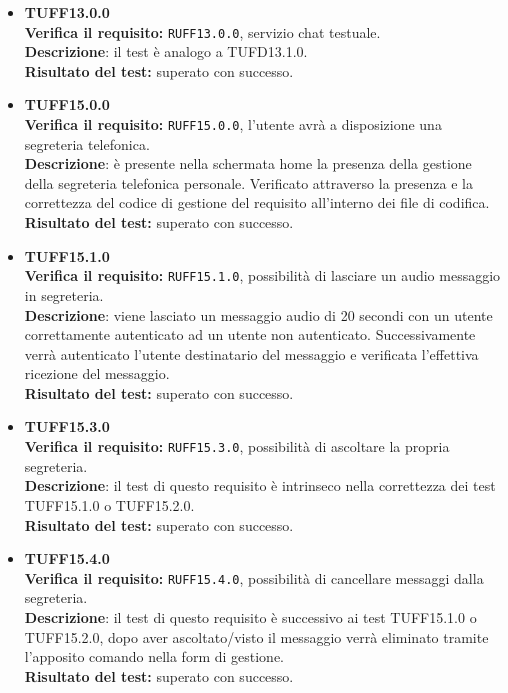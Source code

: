 \begin{itemize}
\item \textbf{TUFF13.0.0}\\
\textbf{Verifica il requisito:} \texttt{RUFF13.0.0}, servizio chat testuale.\\
\textbf{Descrizione}: il test è analogo a TUFD13.1.0.\\
\textbf{Risultato del test:} superato con successo.

\item \textbf{TUFF15.0.0}\\
\textbf{Verifica il requisito:} \texttt{RUFF15.0.0}, l'utente avrà a disposizione una segreteria telefonica.\\
\textbf{Descrizione}: è presente nella schermata home la presenza della gestione della segreteria telefonica personale. Verificato attraverso la presenza e la correttezza del codice di gestione del requisito all'interno dei file di codifica.\\
\textbf{Risultato del test:} superato con successo.

\item \textbf{TUFF15.1.0}\\
\textbf{Verifica il requisito:} \texttt{RUFF15.1.0}, possibilità di lasciare un audio messaggio in segreteria.\\
\textbf{Descrizione}: viene lasciato un messaggio audio di 20 secondi con un utente  correttamente autenticato ad un utente  non autenticato. Successivamente verrà autenticato l'utente  destinatario del messaggio e verificata l'effettiva ricezione del messaggio.\\
\textbf{Risultato del test:} superato con successo.

\item \textbf{TUFF15.3.0}\\
\textbf{Verifica il requisito:} \texttt{RUFF15.3.0}, possibilità di ascoltare la propria segreteria.\\
\textbf{Descrizione}: il test di questo requisito è intrinseco nella correttezza dei test TUFF15.1.0 o TUFF15.2.0.\\
\textbf{Risultato del test:} superato con successo.

\item \textbf{TUFF15.4.0}\\
\textbf{Verifica il requisito:} \texttt{RUFF15.4.0}, possibilità di cancellare messaggi dalla segreteria.\\
\textbf{Descrizione}: il test di questo requisito è successivo ai test TUFF15.1.0 o TUFF15.2.0, dopo aver ascoltato/visto il messaggio verrà eliminato tramite l'apposito comando nella form di gestione.\\
\textbf{Risultato del test:} superato con successo.


\end{itemize}
